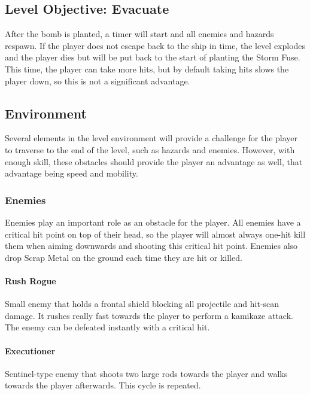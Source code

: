\documentclass[12pt]{article}
\begin{document}
\subsection{Level Objective: Evacuate}

After the bomb is planted, a timer will start and all enemies and hazards respawn. If the player does not escape back to the ship in time, the level explodes and the player dies but will be put back to the start of planting the Storm Fuse. This time, the player can take more hits, but by default taking hits slows the player down, so this is not a significant advantage. 

\subsection{Environment}

Several elements in the level environment will provide a challenge for the player to traverse to the end of the level, such as hazards and enemies. However, with enough skill, these obstacles should provide the player an advantage as well, that advantage being speed and mobility. 

\subsubsection{Enemies}

Enemies play an important role as an obstacle for the player. All enemies have a critical hit point on top of their head, so the player will almost always one-hit kill them when aiming downwards and shooting this critical hit point. Enemies also drop Scrap Metal on the ground each time they are hit or killed.

\paragraph{Rush Rogue}

Small enemy that holds a frontal shield blocking all projectile and hit-scan damage. It rushes really fast towards the player to perform a kamikaze attack. The enemy can be defeated instantly with a critical hit. 

\paragraph{Executioner}

Sentinel-type enemy that shoots two large rods towards the player and walks towards the player afterwards. This cycle is repeated.
\end{document}
